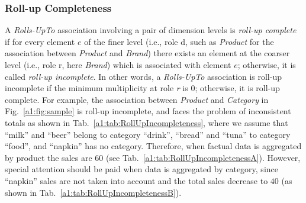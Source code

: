 \subsubsection{Roll-up Completeness}
A \emph{Rolls-UpTo} association involving a pair of dimension levels
is \emph{roll-up complete} if for every element $e$ of the finer
level (i.e., role d, such as \textit{Product} for the association
between \textit{Product} and \textit{Brand}) there exists an element
at the coarser level (i.e., role r, here \textit{Brand}) which is
associated with element $e$; otherwise, it is called \emph{roll-up
incomplete}.  In other words, a \emph{Rolls-UpTo} association is
roll-up incomplete if the minimum multiplicity at role \emph{r} is
$0$; otherwise, it is roll-up complete.  For example, the
association between \textit{Product} and \textit{Category} in
Fig.~\ref{a1:fig:sample} is roll-up incomplete, and faces the
problem of inconsistent totals as shown in
Tab.~\ref{a1:tab:RollUpIncompleteness}, where we assume that
``milk'' and ``beer'' belong to category ``drink'', ``bread'' and
``tuna'' to category ``food'', and ``napkin'' has no category.
Therefore, when factual data is aggregated by product the sales are
$60$ (see Tab.~\ref{a1:tab:RollUpIncompletenessA}). However, special
attention should be paid when data is aggregated by category, since
``napkin'' sales are not taken into account and the total sales
decrease to $40$ (as shown in
Tab.~\ref{a1:tab:RollUpIncompletenessB}).

\begin{table}
\centering \caption{Inconsistent totals for sales due to roll-up
incompleteness}
     \label{a1:tab:RollUpIncompleteness}
 \qquad\qquad {}
\end{table}


